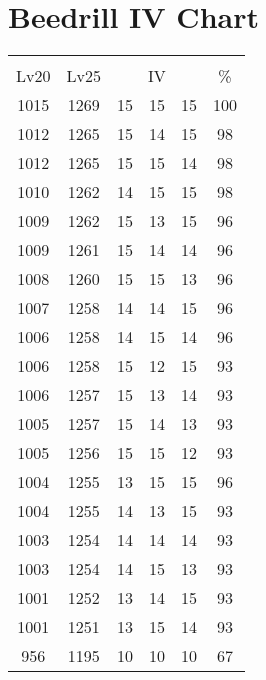 \documentclass{article}%
\begin{document}
%
\normalsize%
\section{Beedrill IV Chart}%
\label{sec:Beedrill IV Chart}%
\renewcommand{\arraystretch}{1.5}%
\begin{tabular}{|c|c|c|c|c|c|}%
\hline%
\multicolumn{6}{|c|}{\textcolor{white}{ 
\linebreak{Beedrill}
}%
\cellcolor{black}}\\%
\multicolumn{1}{|c}{Lv20}&\multicolumn{1}{c|}{Lv25}&\multicolumn{3}{c|}{IV}&\multicolumn{1}{|c|}{\%}\\%
\hline%
\rowcolor{color100}%
1015&1269&15&15&15&100\\%
\hline%
\rowcolor{color98}%
1012&1265&15&14&15&98\\%
\hline%
\rowcolor{color98}%
1012&1265&15&15&14&98\\%
\hline%
\rowcolor{color98}%
1010&1262&14&15&15&98\\%
\hline%
\rowcolor{color96}%
1009&1262&15&13&15&96\\%
\hline%
\rowcolor{color96}%
1009&1261&15&14&14&96\\%
\hline%
\rowcolor{color96}%
1008&1260&15&15&13&96\\%
\hline%
\rowcolor{color96}%
1007&1258&14&14&15&96\\%
\hline%
\rowcolor{color96}%
1006&1258&14&15&14&96\\%
\hline%
\rowcolor{color93}%
1006&1258&15&12&15&93\\%
\hline%
\rowcolor{color93}%
1006&1257&15&13&14&93\\%
\hline%
\rowcolor{color93}%
1005&1257&15&14&13&93\\%
\hline%
\rowcolor{color93}%
1005&1256&15&15&12&93\\%
\hline%
\rowcolor{color96}%
1004&1255&13&15&15&96\\%
\hline%
\rowcolor{color93}%
1004&1255&14&13&15&93\\%
\hline%
\rowcolor{color93}%
1003&1254&14&14&14&93\\%
\hline%
\rowcolor{color93}%
1003&1254&14&15&13&93\\%
\hline%
\rowcolor{color93}%
1001&1252&13&14&15&93\\%
\hline%
\rowcolor{color93}%
1001&1251&13&15&14&93\\%
\hline%
\rowcolor{color91}%
956&1195&10&10&10&67\\%
\end{tabular}

%
\end{document}
